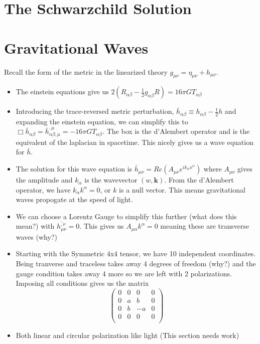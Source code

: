 \documentclass[11pt]{article}
\begin{document}
\section{The Schwarzchild Solution}


\section{Gravitational Waves}
\noindent Recall the form of the metric in the linearized theory $g_{\mu\nu} = \eta_{\mu\nu} + h_{\mu\nu}$.
\begin{itemize}
    \item The einstein equations give us $2(R_{\alpha\beta} - \frac{1}{2}g_{\alpha\beta}R) = 16\pi G T_{\alpha\beta}$
    \item Introducing the trace-reversed metric perturbation, $\bar{h}_{\alpha\beta} \equiv h_{\alpha\beta} - \frac{1}{2}h$
    and expanding the einstein equation, we can simplify this to $\Box \bar{h}_{\alpha\beta} = \bar{h}_{\alpha\beta ,\mu}^{,\mu} = -16\pi G T_{\alpha\beta}$.
    The box is the d'Alembert operator and is the equivalent of the laplacian in spacetime. This nicely gives us a wave equation for $\bar{h}$.

    \item The solution for this wave equation is $\bar{h}_{\mu\nu} = Re(A_{\mu\nu}e^{i k_{\alpha}x^{\alpha}})$ where $A_{\mu\nu}$ gives the amplitude and $k_{\alpha}$
    is the wavevector $(w,\mathbf{k})$. From the d'Alembert operator, we have \( k_{\alpha}k^{\alpha} = 0\), or \( k \) is a null vector. This means gravitational waves
    propogate at the speed of light.

    \item We can choose a Lorentz Gauge to simplify this further (what does this mean?) with \( \overline{h_{\mu\nu}^{,\nu}} = 0 \). This gives us \( A_{\mu\alpha}k^{\alpha} = 0 \)
    meaning these are transverse waves (why?)

    \item Starting with the Symmetric 4x4 tensor, we have 10 independent coordinates. Being tranverse and traceless takes away 4 degrees of freedom (why?) and the gauge condition
    takes away 4 more so we are left with 2 polarizations. Imposing all conditions gives us the matrix 
    \[ 
        \begin{pmatrix}
        0 & 0 & 0 & 0 \\
        0 & a & b & 0 \\
        0 & b & -a & 0 \\
        0 & 0 & 0 & 0 \\
        \end{pmatrix}
    \]
    
    \item Both linear and circular polarization like light (This section needs work)

    
\end{itemize}
\end{document}
